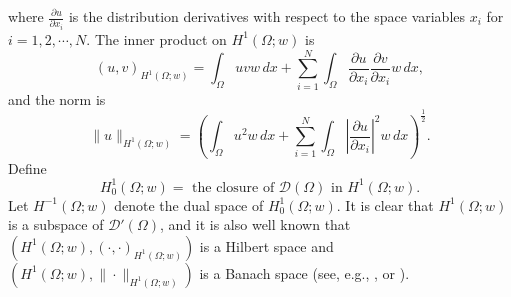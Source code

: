 \documentclass[11pt]{article}
\numberwithin{equation}{section}
\begin{document}
where $\frac{\partial u}{\partial x_i}$ is the distribution derivatives with respect to the space variables $x_i$ for
$i=1,2,\cdots, N$. The inner product on $H^1(\Omega; w)$ is
\begin{equation*}
(u, v)_{H^1(\Omega; w)} = \int_\Omega uvw \, dx + \sum_{i=1}^N \int_\Omega \frac{\partial u}{\partial x_i} \frac{\partial v}{\partial x_i} w \, dx,
\end{equation*}
and the norm is
\begin{equation*}
\|u\|_{H^1(\Omega; w)} = \left(\int_\Omega u^2 w \, dx + \sum_{i=1}^N \int_\Omega \left|\frac{\partial u}{\partial x_i}\right|^2 w \, dx\right)^{\frac{1}{2}}.
\end{equation*}
Define
\begin{equation*}
H_0^1(\Omega; w) = \text{ the closure of } \mathcal{D}(\Omega) \text{  in } H^1(\Omega; w).
\end{equation*}
Let $H^{-1}(\Omega; w)$ denote the dual space of $H_0^1(\Omega; w)$. It is clear that $H^1(\Omega; w)$ is a subspace of $\mathcal{D}'(\Omega)$, and it is also well known that $(H^1(\Omega; w), (\cdot, \cdot)_{H^1(\Omega; w)})$ is a Hilbert space and $(H^1(\Omega; w), \|\cdot\|_{H^1(\Omega; w)})$ is a Banach space (see, e.g., \cite[chapter 1]{Heinonen}, or  \cite[chapter IV]{Garcia-Cuerva}).
\end{document}
